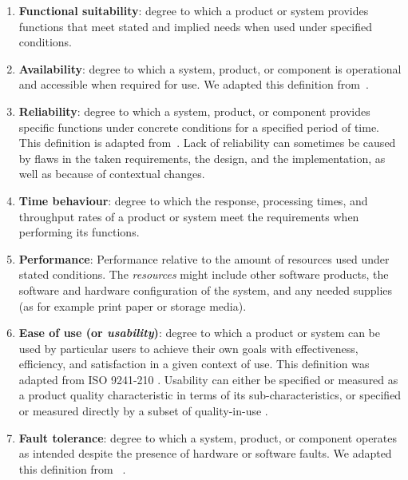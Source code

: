 \begin{enumerate}
    \item \textbf{Functional suitability}: degree to which a product or system provides functions that meet stated and implied needs when used under specified conditions.

    \item \textbf{Availability}: degree to which a system, product, or component is operational and accessible when required for use. We adapted this definition from~\cite{iso_central_secretary_isoiecieee_2010}.

    \item \textbf{Reliability}: degree to which a system, product, or component provides specific functions under concrete conditions for a specified period of time. This definition is adapted from~\cite{iso_central_secretary_isoiecieee_2010}. Lack of reliability can sometimes be caused by flaws in the taken requirements, the design, and the implementation, as well as because of contextual changes.  

    \item \textbf{Time behaviour}: degree to which the response, processing times, and throughput rates of a product or system meet the requirements when performing its functions.

    \item \textbf{Performance}: Performance relative to the amount of resources used under stated conditions. The \textit{resources} might include other software products, the software and hardware configuration of the system, and any needed supplies (as for example print paper or storage media).

    \item \textbf{Ease of use (or \textit{usability})}: degree to which a product or system can be used by particular users to achieve their own goals with effectiveness, efficiency, and satisfaction in a given context of use. This definition was adapted from ISO 9241-210 . Usability can either be specified or measured as a product quality characteristic in terms of its sub-characteristics, or specified or measured directly by a subset of quality-in-use .

    \item \textbf{Fault tolerance}: degree to which a system, product, or component operates as intended despite the presence of hardware or software faults. We adapted this definition from ~\cite{iso_central_secretary_isoiecieee_2010}.


\end{enumerate}
